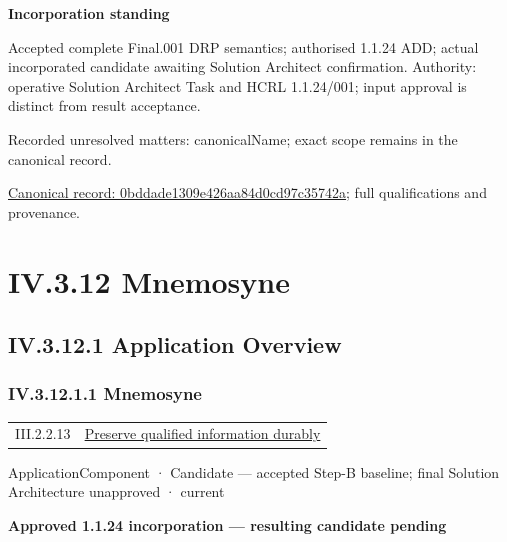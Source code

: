 \par\medskip\textbf{Incorporation standing}\par


Accepted complete Final.001 DRP semantics; authorised 1.1.24 ADD; actual incorporated candidate awaiting Solution Architect confirmation. Authority: operative Solution Architect Task and HCRL 1.1.24/001; input approval is distinct from result acceptance.


{\small Recorded unresolved matters: canonicalName; exact scope remains in the canonical record.}\par
{\footnotesize \href{../../../../../../../continuum/application/application-function/0bddade1309e426aa84d0cd97c35742a.md}{Canonical record: 0bddade1309e426aa84d0cd97c35742a}; full qualifications and provenance.}\par
\section*{IV.3.12 Mnemosyne}
\label{navigation:IV.3.12}

\subsection*{IV.3.12.1 Application Overview}
\label{navigation:IV.3.12.1}

\subsubsection*{IV.3.12.1.1 Mnemosyne}
\label{navigation:IV.3.12.1.1}

\begin{longtable}{p{.22\linewidth}p{.73\linewidth}}
III.2.2.13 & \hyperref[element:e07ef0bcd9444af3a22ab45bbb3afc38]{Preserve qualified information durably} \\
\end{longtable}
\label{element:7985e647bf9e4ca3ba70faf9e3e4ae02}
{\small ApplicationComponent · Candidate — accepted Step-B baseline; final Solution Architecture unapproved · current}\par

\par\medskip\textbf{Approved 1.1.24 incorporation — resulting candidate pending}\par


